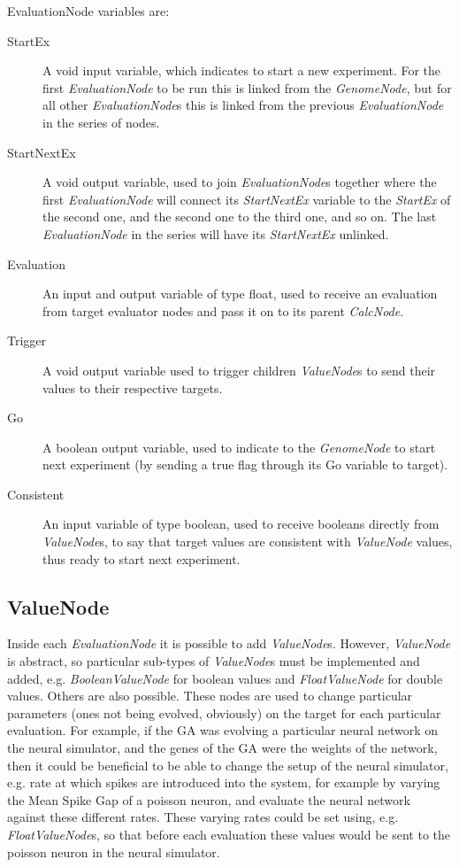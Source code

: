 \documentclass[10pt, notitlepage, a4paper]{article}
\begin{document}
\noindent EvaluationNode variables are:
\begin{description}
\item[StartEx]A void input variable, which indicates to start a new experiment. For the first {\it EvaluationNode} to be run this is linked from the {\it GenomeNode}, but for all other {\it EvaluationNode}s this is linked from the previous {\it EvaluationNode} in the series of nodes.

\item[StartNextEx]A void output variable, used to join {\it EvaluationNode}s together where the first {\it EvaluationNode} will connect its {\it StartNextEx} variable to the {\it StartEx} of the second one, and the second one to the third one, and so on. The last {\it EvaluationNode} in the series will have its {\it StartNextEx} unlinked.

\item[Evaluation]An input and output variable of type float, used to receive an evaluation from target evaluator nodes and pass it on to its parent {\it CalcNode}.

\item[Trigger]A void output variable used to trigger children {\it ValueNode}s to send their values to their respective targets.

\item[Go]A boolean output variable, used to indicate to the {\it GenomeNode} to start next experiment (by sending a true flag through its Go variable to target).

\item[Consistent]An input variable of type boolean, used to receive booleans directly from {\it ValueNode}s, to say that target values are consistent with {\it ValueNode} values, thus ready to start next experiment.
\end{description}

\subsection{ValueNode}
Inside each {\it EvaluationNode} it is possible to add {\it ValueNode}s. However, {\it ValueNode} is abstract, so particular sub-types of {\it ValueNode}s must be implemented and added, e.g. {\it BooleanValueNode} for boolean values and {\it FloatValueNode} for double values. Others are also possible. These nodes are used to change particular parameters (ones not being evolved, obviously) on the target for each particular evaluation. For example, if the GA was evolving a particular neural network on the neural simulator, and the genes of the GA were the weights of the network, then it could be beneficial to be able to change the setup of the neural simulator, e.g. rate at which spikes are introduced into the system, for example by varying the Mean Spike Gap of a poisson neuron, and evaluate the neural network against these different rates. These varying rates could be set using, e.g. {\it FloatValueNode}s, so that before each evaluation these values would be sent to the poisson neuron in the neural simulator.
\end{document}
